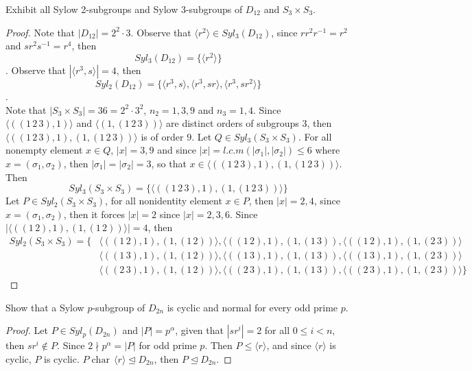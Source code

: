 \documentclass{article}
\newenvironment{problem}[2][Problem]{\begin{trivlist}
\item[\hskip \labelsep {\bfseries #1}\hskip \labelsep {\bfseries #2.}]}{\end{trivlist}}
\DeclareMathOperator{\Char}{char}
\begin{document}
\begin{problem}{4}
    Exhibit all Sylow 2-subgroups and Sylow 3-subgroups of $D_{12}$ and $S_3 \times S_3$.
\end{problem}
\begin{proof}
    Note that $|D_{12}|=2^2\cdot 3$. Observe that $\langle r^2 \rangle \in Syl_3(D_{12})$, since $rr^2r^{-1}=r^2$ and $sr^2s^{-1}=r^4$, then \[Syl_3(D_{12})=\{\langle r^2 \rangle\}\]. Observe that $|\langle r^3, s\rangle|=4$, then \[Syl_2(D_{12})=\{\langle r^3, s\rangle, \langle r^3, sr\rangle, \langle r^3, sr^2\rangle\}\].\\
    Note that $|S_3\times S_3|=36=2^2\cdot 3^2$, $n_2=1, 3, 9$ and $n_3=1, 4$. Since $\langle ((1\, 2\, 3), 1) \rangle$ and $\langle (1, (1\, 2\, 3)) \rangle$ are distinct orders of subgroups $3$, then $\langle ((1\, 2\, 3), 1),  (1, (1\, 2\, 3)) \rangle$ is of order $9$. 
    Let $Q \in Syl_3(S_3 \times S_3)$. For all nonempty element $x \in Q$, $|x|=3, 9$ and since $|x|=l.c.m(|\sigma_1|, |\sigma_2|)\leq 6$ where $x=(\sigma_1, \sigma_2)$, then $|\sigma_1|=|\sigma_2|=3$, so that $x \in \langle ((1\, 2\, 3), 1),  (1, (1\, 2\, 3)) \rangle$. Then 
    \[
    Syl_3(S_3\times S_3)=\{\langle ((1\, 2\, 3), 1),  (1, (1\, 2\, 3)) \rangle\}
    \]
    Let $P\in Syl_2(S_3\times S_3)$, for all nonidentity element $x \in P$, then $|x|=2, 4$, since $x=(\sigma_1, \sigma_2)$, then it forces $|x|=2$ since $|x|=2, 3, 6$. Since $|\langle ((1\, 2), 1), (1, (1\, 2))\rangle|=4$, then 
    \begin{align*}
        Syl_2(S_3\times S_3)=\{&\langle ((1\, 2), 1), (1, (1\, 2))\rangle, \langle ((1\, 2), 1), (1, (1\, 3)), \langle ((1\, 2), 1), (1, (2\, 3))\rangle\\
        &\langle ((1\, 3), 1), (1, (1\, 2))\rangle, \langle ((1\, 3), 1), (1, (1\, 3)), \langle ((1\, 3), 1), (1, (2\, 3))\rangle\\
        &\langle ((2\, 3), 1), (1, (1\, 2))\rangle, \langle ((2\, 3), 1), (1, (1\, 3)), \langle ((2\, 3), 1), (1, (2\, 3))\rangle \}
    \end{align*}
\end{proof}
\begin{problem}{5}
    Show that a Sylow $p$-subgroup of $D_{2n}$ is cyclic and normal for every odd prime $p$.
\end{problem}
\begin{proof}
    Let $P\in Syl_p(D_{2n})$ and $|P|=p^{\alpha}$, given that $|sr^{i}|=2$ for all $0\leq i<n$, then $sr^{i}\notin P$. Since $2 \nmid p^{\alpha}=|P|$ for odd prime $p$. Then $P\leq \langle r \rangle$, and since $\langle r \rangle$ is cyclic, $P$ is cyclic. $P\Char\, \langle r \rangle \trianglelefteq D_{2n}$, then $P\trianglelefteq D_{2n}$.
\end{proof}
\end{document}
